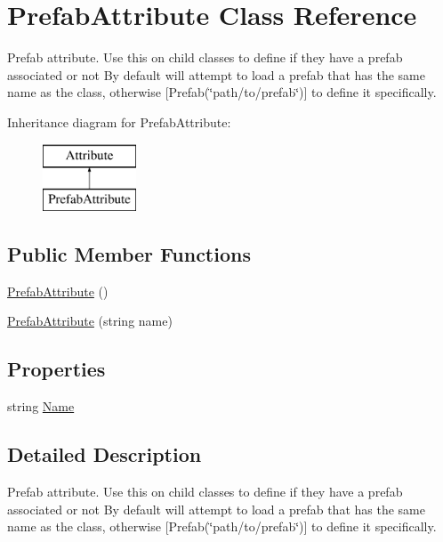 \hypertarget{class_prefab_attribute}{}\section{Prefab\+Attribute Class Reference}
\label{class_prefab_attribute}


Prefab attribute. Use this on child classes to define if they have a prefab associated or not By default will attempt to load a prefab that has the same name as the class, otherwise \mbox{[}Prefab(\char`\"{}path/to/prefab\char`\"{})\mbox{]} to define it specifically.  


Inheritance diagram for Prefab\+Attribute\+:\begin{figure}[H]
\begin{center}
\leavevmode
\includegraphics[height=2.000000cm]{class_prefab_attribute}
\end{center}
\end{figure}
\subsection*{Public Member Functions}
\begin{DoxyCompactItemize}
\item 
\hyperlink{class_prefab_attribute_a6cb400d126d264a5271de695d16b181f}{Prefab\+Attribute} ()
\item 
\hyperlink{class_prefab_attribute_a70e8090f1d10a239de87fe96b9dcf791}{Prefab\+Attribute} (string name)
\end{DoxyCompactItemize}
\subsection*{Properties}
\begin{DoxyCompactItemize}
\item 
string \hyperlink{class_prefab_attribute_ab7f39786c214e4d6506e72158bec3afc}{Name}
\end{DoxyCompactItemize}


\subsection{Detailed Description}
Prefab attribute. Use this on child classes to define if they have a prefab associated or not By default will attempt to load a prefab that has the same name as the class, otherwise \mbox{[}Prefab(\char`\"{}path/to/prefab\char`\"{})\mbox{]} to define it specifically. 



